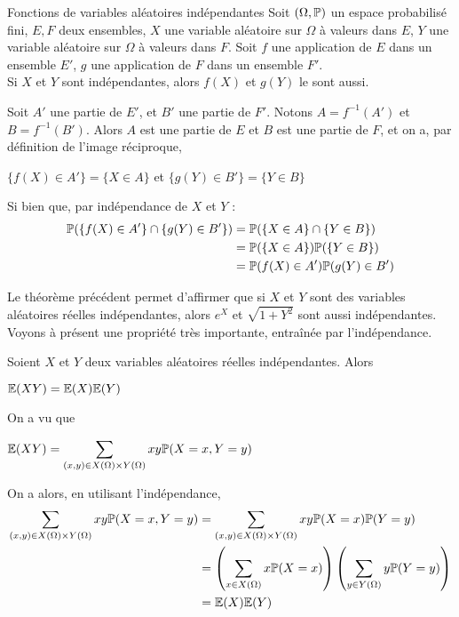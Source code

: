 \documentclass[12pt,a4paper]{report}
\begin{document}
\begin{theoreme}{Fonctions de variables aléatoires indépendantes}{}
Soit $(\Omega, \mathbb{P})$ un espace probabilisé fini, $E,F$ deux ensembles, $X$ une variable aléatoire sur $\Omega$ à valeurs dans $E$, $Y$ une variable aléatoire sur $\Omega$ à valeurs dans $F$. Soit $f$ une application de $E$ dans un ensemble $E'$, $g$ une application de $F$ dans un ensemble $F'$. \\
Si $X$ et $Y$ sont indépendantes, alors $f(X)$ et $g(Y)$ le sont aussi.
\end{theoreme}

\begin{demo}{}
Soit $A'$ une partie de $E'$, et $B'$ une partie de $F'$. Notons $A = f^{-1}(A')$ et $B = f^{-1}(B')$. Alors $A$ est une partie de $E$ et $B$ est une partie de $F$, et on a, par définition de l'image réciproque, 
\begin{center}
$\{f(X) \in A'\} = \{X \in A\}$ et $\{g(Y) \in B'\} = \{Y \in B\}$
\end{center}
Si bien que, par indépendance de $X$ et $Y$ : 
\begin{align*}
\mathbb{P}(\{f(X) \in A'\} \cap \{g(Y) \in B'\}) &= \mathbb{P}(\{X \in A\} \cap \{Y \in B\}) \\
&= \mathbb{P}(\{X \in A\})\mathbb{P}(\{Y \in B\}) \\
&= \mathbb{P}(f(X) \in A')\mathbb{P}(g(Y) \in B')
\end{align*}
\end{demo}

Le théorème précédent permet d'affirmer que si $X$ et $Y$ sont des variables aléatoires réelles indépendantes, alors $e^X$ et $\sqrt{1+Y^2}$ sont aussi indépendantes. \\

Voyons à présent une propriété très importante, entraînée par l'indépendance.

\begin{theoreme}{}{}
Soient $X$ et $Y$ deux variables aléatoires réelles indépendantes. Alors
\begin{center}
$\mathbb{E}(XY) = \mathbb{E}(X)\mathbb{E}(Y)$
\end{center}
\end{theoreme}

\begin{demo}{}
On a vu que 
\begin{center}
$\mathbb{E}(XY) = \displaystyle \sum_{(x,y) \in X(\Omega) \times Y(\Omega)} xy \mathbb{P}(X=x,Y=y)$
\end{center}

On a alors, en utilisant l'indépendance,
\begin{align*}
\sum_{(x,y) \in X(\Omega) \times Y(\Omega)} xy\mathbb{P}(X=x,Y=y) &= \sum_{(x,y) \in X(\Omega) \times Y(\Omega)} xy \mathbb{P}(X=x)\mathbb{P}(Y=y) \\
&= \left(\sum_{x \in X(\Omega)} x\mathbb{P}(X=x)\right) \left(\sum_{y \in Y(\Omega)} y\mathbb{P}(Y=y)\right) \\
&= \mathbb{E}(X) \mathbb{E}(Y)
\end{align*}
\end{demo}
\end{document}
